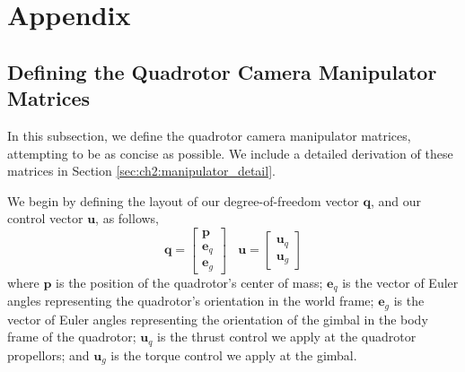 

\section{Appendix}

\subsection{Defining the Quadrotor Camera Manipulator Matrices}
\label{sec:ch2:manipulator}

In this subsection, we define the quadrotor camera manipulator matrices, attempting to be as concise as possible.
We include a detailed derivation of these matrices in Section \ref{sec:ch2:manipulator_detail}.

We begin by defining the layout of our degree-of-freedom vector $\mathbf{q}$, and our control vector $\mathbf{u}$, as follows,
%
\begin{equation}
\mathbf{q} = 
\begin{bmatrix}
\mathbf{p} \\
\mathbf{e}_q \\
\mathbf{e}_g
\end{bmatrix}
%
~~~~
\mathbf{u} = 
\begin{bmatrix}
\mathbf{u}_q \\
\mathbf{u}_g
\end{bmatrix}
\end{equation}
%
where $\mathbf{p}$ is the position of the quadrotor's center of mass; $\mathbf{e}_q$ is the vector of Euler angles representing the quadrotor's orientation in the world frame; $\mathbf{e}_g$ is the vector of Euler angles representing the orientation of the gimbal in the body frame of the quadrotor; $\mathbf{u}_q$ is the thrust control we apply at the quadrotor propellors; and $\mathbf{u}_g$ is the torque control we apply at the gimbal.

